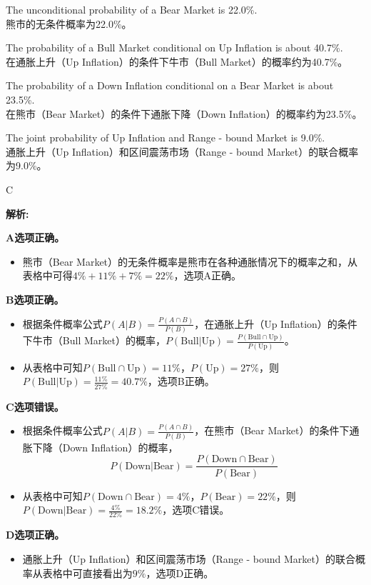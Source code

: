 \documentclass{article}
\newenvironment{explanation}
{\textbf{解析:}\par}
{\par}
\begin{document}
    \begin{choices}
        \item The unconditional probability of a Bear Market is 22.0\%.\\
        熊市的无条件概率为22.0\%。
        \item The probability of a Bull Market conditional on Up Inflation is about 40.7\%.\\
        在通胀上升（Up Inflation）的条件下牛市（Bull Market）的概率约为40.7\%。
        \item The probability of a Down Inflation conditional on a Bear Market is about 23.5\%.\\
        在熊市（Bear Market）的条件下通胀下降（Down Inflation）的概率约为23.5\%。
        \item The joint probability of Up Inflation and Range - bound Market is 9.0\%.\\
        通胀上升（Up Inflation）和区间震荡市场（Range - bound Market）的联合概率为9.0\%。
    \end{choices}
    
    \begin{correctanswer}
    C
    \end{correctanswer}
    
    \begin{explanation}
    \textbf{A选项正确。}
    \begin{itemize}
    \item 熊市（Bear Market）的无条件概率是熊市在各种通胀情况下的概率之和，从表格中可得\(4\%+11\% + 7\%=22\%\)，选项A正确。
    \end{itemize}
    \textbf{B选项正确。}
    \begin{itemize}
    \item 根据条件概率公式\(P(A|B)=\frac{P(A\cap B)}{P(B)}\)，在通胀上升（Up Inflation）的条件下牛市（Bull Market）的概率，\(P(\text{Bull}|\text{Up})=\frac{P(\text{Bull}\cap\text{Up})}{P(\text{Up})}\)。
    \item 从表格中可知\(P(\text{Bull}\cap\text{Up}) = 11\%\)，\(P(\text{Up})=27\%\)，则\(P(\text{Bull}|\text{Up})=\frac{11\%}{27\%} = 40.7\%\)，选项B正确。 
    \end{itemize}
    \textbf{C选项错误。}
    \begin{itemize}
    \item 根据条件概率公式\(P(A|B)=\frac{P(A\cap B)}{P(B)}\)，在熊市（Bear Market）的条件下通胀下降（Down Inflation）的概率，\[P(\text{Down}|\text{Bear})=\frac{P(\text{Down}\cap\text{Bear})}{P(\text{Bear})}\]
    \item 从表格中可知\(P(\text{Down}\cap\text{Bear}) = 4\%\)，\(P(\text{Bear})=22\%\)，则\(P(\text{Down}|\text{Bear})=\frac{4\%}{22\%}=18.2\%\)，选项C错误。 
    \end{itemize}
    \textbf{D选项正确。}
    \begin{itemize}
    \item 通胀上升（Up Inflation）和区间震荡市场（Range - bound Market）的联合概率从表格中可直接看出为\(9\%\)，选项D正确。 
    \end{itemize}
    \end{explanation}
    
\end{document}
